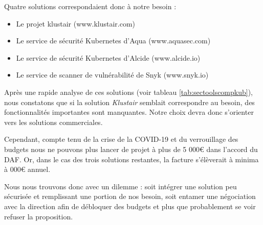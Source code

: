 Quatre solutions correspondaient donc à notre besoin :
\begin{itemize}
    \item Le projet klustair (www.klustair.com)
    \item Le service de sécurité Kubernetes d'Aqua (www.aquasec.com)
    \item Le service de sécurité Kubernetes d'Alcide (www.alcide.io)
    \item Le service de scanner de vulnérabilité de Snyk (www.snyk.io)
\end{itemize}

Après une rapide analyse de ces solutions (voir tableau \ref{tab:sectoolscompkub}), nous constatons que si la solution 
\emph{Klustair} semblait correspondre au besoin, des fonctionnalités importantes sont manquantes. Notre choix devra donc
s'orienter vers les solutions commerciales.

Cependant, compte tenu de la crise de la COVID-19 et du verrouillage des budgets nous ne pouvons plus lancer de projet à 
plus de 5 000€ dans l'accord du \ac{DAF}. Or, dans le cas des trois solutions restantes, la facture s'élèverait à minima
à  000€ annuel.

Nous nous trouvons donc avec un dilemme : soit intégrer une solution peu sécurisée et remplissant une portion de nos 
besoin, soit entamer une négociation avec la direction afin de débloquer des budgets et plus que probablement se voir 
refuser la proposition.

\newpage 

